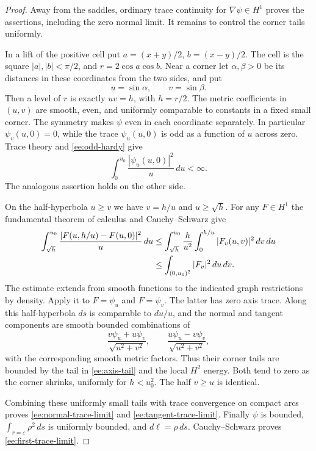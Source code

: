 \documentclass[reqno,11pt]{amsart}
\numberwithin{equation}{section}
\theoremstyle{remark}
\begin{document}
\begin{proof}
Away from the saddles, ordinary trace continuity for
$\nabla\psi\in H^1$ proves the assertions, including the zero
normal limit. It remains to control the corner tails uniformly.

In a lift of the positive cell put $a=(x+y)/2$, $b=(x-y)/2$.
The cell is the square $|a|,|b|<\pi/2$, and
$r=2\cos a\cos b$. Near a corner let $\alpha,\beta>0$ be its
distances in these coordinates from the two sides, and put
\[
 u=\sin\alpha,\qquad v=\sin\beta.
\]
Then a level of $r$ is exactly $uv=h$, with $h=r/2$.
The metric coefficients in $(u,v)$ are smooth, even, and uniformly
comparable to constants in a fixed small corner. The symmetry
makes $\psi$ even in each coordinate separately. In particular
$\psi_v(u,0)=0$, while the trace $\psi_u(u,0)$ is odd as a
function of $u$ across zero. Trace theory and
\eqref{ee:odd-hardy} give
\begin{equation}\label{ee:axis-tail}
 \int_0^{u_0}\frac{|\psi_u(u,0)|^2}{u}\,du<\infty.
\end{equation}
The analogous assertion holds on the other side.

On the half-hyperbola $u\ge v$ we have $v=h/u$ and
$u\ge\sqrt h$. For any $F\in H^1$ the fundamental theorem of
calculus and Cauchy--Schwarz give
\begin{align}\label{ee:hyperbola-estimate}
 \int_{\sqrt h}^{u_0}
  \frac{|F(u,h/u)-F(u,0)|^2}{u}\,du
 &\le \int_{\sqrt h}^{u_0}\frac h{u^2}
                 \int_0^{h/u}|F_v(u,v)|^2\,dv\,du\notag\\
 &\le\int_{(0,u_0)^2}|F_v|^2\,du\,dv.
\end{align}
The estimate extends from smooth functions to the indicated graph
restrictions by density. Apply it to $F=\psi_u$ and
$F=\psi_v$. The latter has zero axis trace. Along this
half-hyperbola $ds$ is comparable to $du/u$, and the normal and
tangent components are smooth bounded combinations of
\[
 \frac{v\psi_u+u\psi_v}{\sqrt{u^2+v^2}},\qquad
 \frac{u\psi_u-v\psi_v}{\sqrt{u^2+v^2}},
\]
with the corresponding smooth metric factors. Thus their corner
tails are bounded by the tail in \eqref{ee:axis-tail} and the local
$H^2$ energy. Both tend to zero as the corner shrinks, uniformly
for $h<u_0^2$. The half $v\ge u$ is identical.

Combining these uniformly small tails with trace convergence on
compact arcs proves \eqref{ee:normal-trace-limit} and
\eqref{ee:tangent-trace-limit}. Finally $\psi$ is bounded,
$\int_{r=\varepsilon}\rho^2\,ds$ is uniformly bounded, and
$d\ell=\rho\,ds$. Cauchy--Schwarz proves
\eqref{ee:first-trace-limit}.
\end{proof}
\end{document}
